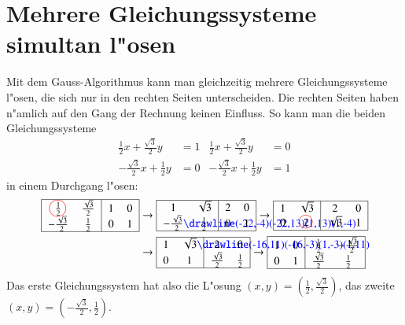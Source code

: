 \section{Mehrere Gleichungssysteme simultan l"osen\label{simultan}}
Mit dem Gauss-Algorithmus kann man gleichzeitig mehrere Gleichungssysteme
l"osen, die sich nur in den rechten Seiten unterscheiden.
Die rechten Seiten haben n"amlich auf den Gang der Rechnung keinen
Einfluss.
So kann man die beiden Gleichungssysteme
\begin{align*}
\frac12x+\frac{\sqrt{3}}2y&=1
&
\frac12x+\frac{\sqrt{3}}2y&=0
\\
-\frac{\sqrt{3}}2x+\frac12y&=0
&
-\frac{\sqrt{3}}2x+\frac12y&=1
\end{align*}
in einem Durchgang l"osen:
\begin{align*}
\begin{tabular}{|>{$}c<{$}>{$}c<{$}|>{$}c<{$}>{$}c<{$}|}
\hline
\frac12%
\begin{picture}(0,0)
\color{red}\put(-3.5,3){\circle{15}}
\end{picture}%
&\frac{\sqrt{3}}2&1&0\\
-\frac{\sqrt{3}}2&\frac12&0&1\\
\hline
\end{tabular}
&\rightarrow
\begin{tabular}{|>{$}c<{$}>{$}c<{$}|>{$}c<{$}>{$}c<{$}|}
\hline
1&\sqrt{3}&2&0\\
-\frac{\sqrt{3}}2%
\begin{picture}(0,0)
\color{blue}\drawline(-22,-4)(-22,13)(1,13)(1,-4)
\end{picture}%
&\frac12&0&1\\
\hline
\end{tabular}
\rightarrow
\begin{tabular}{|>{$}c<{$}>{$}c<{$}|>{$}c<{$}>{$}c<{$}|}
\hline
1&\sqrt{3}&2&0\\
0&2%
\begin{picture}(0,0)
\color{red}\put(-3,4){\circle{12}}
\end{picture}%
&\sqrt{3}&1\\
\hline
\end{tabular}
\\
&\rightarrow
\begin{tabular}{|>{$}c<{$}>{$}c<{$}|>{$}c<{$}>{$}c<{$}|}
\hline
1&\sqrt{3}%
\begin{picture}(0,0)
\color{blue}\drawline(-16,11)(-16,-3)(1,-3)(1,11)
\end{picture}%
&2&0\\
0&1&\frac{\sqrt{3}}2&\frac12\\
\hline
\end{tabular}
\rightarrow
\begin{tabular}{|>{$}c<{$}>{$}c<{$}|>{$}c<{$}>{$}c<{$}|}
\hline
1&0&\frac12&-\frac{\sqrt{3}}2\\
0&1&\frac{\sqrt{3}}2&\frac12\\
\hline
\end{tabular}
\end{align*}
Das erste Gleichungssystem hat also die L"osung
$(x,y)=(\frac12,\frac{\sqrt{3}}2)$,
das zweite
$(x,y)=(-\frac{\sqrt{3}}2, \frac12)$.


